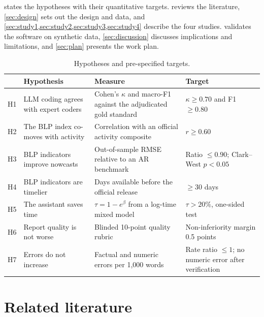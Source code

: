 \documentclass[11pt]{article}
\begin{document}
 states the hypotheses with their quantitative targets.  reviews the literature, \cref{sec:design} sets out the design and data, and \cref{sec:study1,sec:study2,sec:study3,sec:study4} describe the four studies.  validates the software on synthetic data, \cref{sec:discussion} discusses implications and limitations, and \cref{sec:plan} presents the work plan.

\begin{table}[tbp]
\centering\small
\caption{Hypotheses and pre-specified targets.}\label{tab:hypotheses}
\begin{tabularx}{\textwidth}{@{}L{0.75cm}YL{4.2cm}L{4.1cm}@{}}
\toprule
 & Hypothesis & Measure & Target \\
\midrule
H1 & LLM coding agrees with expert coders & Cohen's $\kappa$ and macro-F1 against the adjudicated gold standard & $\kappa \geq 0.70$ and F1 $\geq 0.80$ \\
H2 & The BLP index co-moves with activity & Correlation with an official activity composite & $r \geq 0.60$ \\
H3 & BLP indicators improve nowcasts & Out-of-sample RMSE relative to an AR benchmark & Ratio $\leq 0.90$; Clark--West $p < 0.05$ \\
H4 & BLP indicators are timelier & Days available before the official release & $\geq 30$ days \\
H5 & The assistant saves time & $\tau = 1 - e^{\beta}$ from a log-time mixed model & $\tau > 20\%$, one-sided test \\
H6 & Report quality is not worse & Blinded 10-point quality rubric & Non-inferiority margin 0.5 points \\
H7 & Errors do not increase & Factual and numeric errors per 1{,}000 words & Rate ratio $\leq 1$; no numeric error after verification \\
\bottomrule
\end{tabularx}
\end{table}

\section{Related literature}\label{sec:literature}
\end{document}
